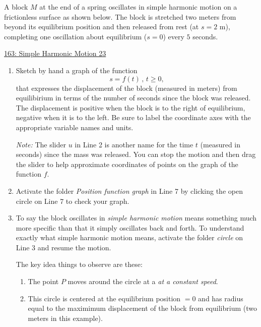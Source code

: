 \documentclass{ximera}
\begin{document}
\begin{example}  \label{Ex:LLL}
A block $M$ at the end of a spring oscillates in simple harmonic motion on a frictionless surface as shown below. The block is stretched two meters from beyond its equilibrium position and then released from rest (at $s=2$ m), completing one oscillation about equilibrium ($s=0$) every $5$ seconds. 

\begin{onlineOnly}
    \begin{center}
\end{center}
\end{onlineOnly}

\href{https://www.desmos.com/calculator/dcba538898}{163: Simple Harmonic Motion 23}

\begin{enumerate}
\item Sketch by hand a graph of the function
\[
      s = f(t) \, , \, t\geq 0,
\]
that expresses the displacement of the block (measured in meters) from equilibirium in terms of the number of seconds since the block was released. The displacement is positive when the block is to the right of equilibrium, negative when it is to the left. Be sure to label the coordinate axes with the appropriate variable names and units.

\emph{Note:} The slider $u$ in Line 2 is another name for the time $t$ (measured in seconds) since the mass was released. You can stop the motion and then drag the slider to help approximate coordinates of points on the graph of the function $f$.

\item Activate the folder \emph{Position function graph} in Line 7 by clicking the open circle on Line 7 to check your graph.

\item To say the block oscillates in \emph{simple harmonic motion} means something much more specific than that it simply oscillates back and forth. To understand exactly what simple harmonic motion means, activate the folder \emph{circle} on Line 3 and resume the motion.

The key idea things to observe are these:

\begin{enumerate}

\item The point $P$ moves around the circle at a \emph{at a constant speed}.

\item This circle is centered at the equilibrium position $=0$ and has radius equal to the maximimum displacement of the block from equilibrium (two meters in this example).


\end{enumerate}
\end{enumerate}
\end{example}
\end{document}
